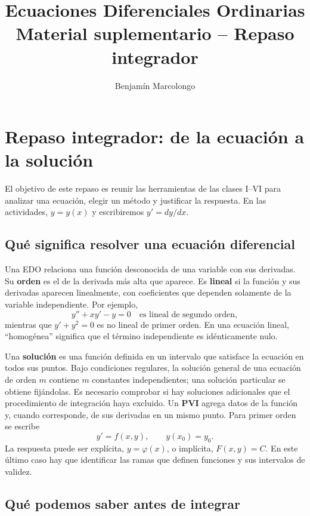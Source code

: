 \documentclass[12pt,a4paper]{article}
\title{Ecuaciones Diferenciales Ordinarias\\Material suplementario -- Repaso integrador}
\author{Benjamín Marcolongo}
\date{}
\begin{document}
	\maketitle

	\section{Repaso integrador: de la ecuación a la solución}

	El objetivo de este repaso es reunir las herramientas de las clases I--VI para analizar una ecuación, elegir un método y justificar la respuesta. En las actividades, \(y=y(x)\) y escribiremos \(y'=dy/dx\).

	\subsection{Qué significa resolver una ecuación diferencial}

	Una EDO relaciona una función desconocida de una variable con sus derivadas. Su \textbf{orden} es el de la derivada más alta que aparece. Es \textbf{lineal} si la función y sus derivadas aparecen linealmente, con coeficientes que dependen solamente de la variable independiente. Por ejemplo,
	\[
	y''+xy'-y=0 \quad\text{es lineal de segundo orden},
	\]
	mientras que \(y'+y^2=0\) es no lineal de primer orden. En una ecuación lineal, ``homogénea'' significa que el término independiente es idénticamente nulo.

	Una \textbf{solución} es una función definida en un intervalo que satisface la ecuación en todos sus puntos. Bajo condiciones regulares, la solución general de una ecuación de orden \(m\) contiene \(m\) constantes independientes; una solución particular se obtiene fijándolas. Es necesario comprobar si hay soluciones adicionales que el procedimiento de integración haya excluido.
	Un \textbf{PVI} agrega datos de la función y, cuando corresponde, de sus derivadas en un mismo punto. Para primer orden se escribe
	\[
	y'=f(x,y),\qquad y(x_0)=y_0.
	\]
	La respuesta puede ser explícita, \(y=\varphi(x)\), o implícita, \(F(x,y)=C\). En este último caso hay que identificar las ramas que definen funciones y sus intervalos de validez.

	\subsection{Qué podemos saber antes de integrar}
\end{document}
